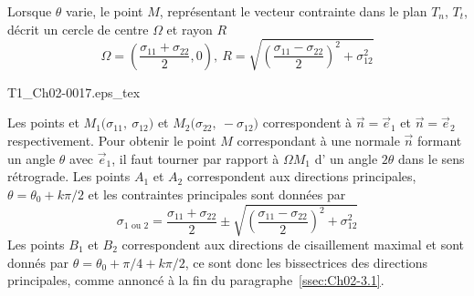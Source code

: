 Lorsque $\theta$ varie, le point $M$, représentant le vecteur contrainte dans le plan $T_n$, $T_t$, décrit un cercle de centre $\Omega$ et rayon $R$
\begin{equation}
    \Omega = \left( \frac{\sigma_{11}+\sigma_{22}}{2}, 0 \right), \ R = \sqrt{\left( \frac{\sigma_{11} - \sigma_{22}}{2} \right)^2 + \sigma_{12}^2}
    \label{eq:Ch02-045}
\end{equation}
\begin{center}
    {T1_Ch02-0017.eps_tex}
\end{center}
Les points  et $M_1\bigl( \sigma_{11},\ \sigma_{12} \bigr)$ et $M_2\bigl( \sigma_{22},\ -\sigma_{12} \bigr)$ correspondent à $\vec{n} = \vec{e}_1$ et $\vec{n}=\vec{e}_2$ respectivement. 
Pour obtenir le point $M$ correspondant à une normale $\vec{n}$ formant un angle $\theta$ avec $\vec{e}_1$, il faut tourner par rapport à $\Omega M_1$ d' un angle $2\theta$ dans le sens rétrograde.
Les points $A_1$ et $A_2$ correspondent aux directions principales, $\theta = \theta_0 + k\pi/2$ et les contraintes principales sont données par 
\begin{equation}
    \sigma_{1\text{ ou }2} = \frac{\sigma_{11} + \sigma_{22}}{2} \pm \sqrt{\left( \frac{\sigma_{11} - \sigma_{22}}{2} \right)^2 +\sigma_{12}^2}
    \label{eq:Ch02-046}
\end{equation}
Les points $B_1$ et $B_2$ correspondent aux directions de cisaillement maximal et sont donnés par $\theta = \theta_0 + \pi/4 + k\pi/2$, ce sont donc les bissectrices des directions principales, comme annoncé à la fin du paragraphe~\ref{ssec:Ch02-3.1}. 

